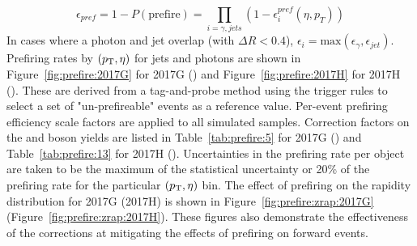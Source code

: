
\begin{equation}
    \epsilon_{pref} = 1 - P(\mathrm{prefire}) = \prod_{i=\gamma,jets}{(1 - \epsilon_i^{pref}(\eta,p_T))}
    \label{eq:prefiring_weight}
\end{equation}
In cases where a photon and jet overlap (with $\Delta  R < 0.4$), $\epsilon_i=\mathrm{max}(\epsilon_\gamma,\epsilon_{jet})$.
Prefiring rates by $(p_{\mathrm{T}},\eta)$ for jets and photons are shown in Figure~\ref{fig:prefire:2017G} for 2017G (\sg) and Figure~\ref{fig:prefire:2017H} for 2017H (\sh). These are derived from a tag-and-probe method using the trigger rules to select a set of "un-prefireable" events as a reference value. Per-event prefiring efficiency scale factors are applied to all simulated samples. Correction factors on the \Wpm and \Z boson yields are listed in Table~\ref{tab:prefire:5} for 2017G (\sg) and Table~\ref{tab:prefire:13} for 2017H (\sh). Uncertainties in the prefiring rate per object are taken to be the maximum of the statistical uncertainty or 20\% of the prefiring rate for the particular $(p_{\mathrm{T}},\eta)$ bin. The effect of prefiring on the \zee rapidity distribution for 2017G (2017H) is shown in  Figure~\ref{fig:prefire:zrap:2017G} (Figure~\ref{fig:prefire:zrap:2017H}). These figures also demonstrate the effectiveness of the corrections at mitigating the effects of prefiring on forward events.






